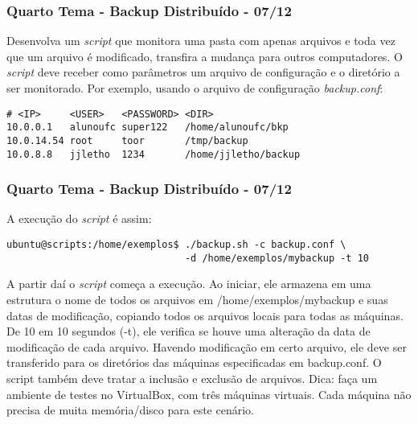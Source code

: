 \documentclass{beamer}
\begin{document}
   \begin{frame}[fragile]
      \frametitle{Quarto Tema - Backup Distribuído - 07/12}
   Desenvolva um \textit{script} que monitora uma pasta com apenas arquivos e toda vez que um arquivo é modificado, transfira a mudança para outros computadores. O \textit{script} deve receber como parâmetros um arquivo de configuração e o diretório a ser monitorado. Por exemplo, usando o arquivo de configuração \textit{backup.conf}:
      \begin{verbatim}
# <IP>     <USER>   <PASSWORD> <DIR>
10.0.0.1   alunoufc super122   /home/alunoufc/bkp
10.0.14.54 root     toor       /tmp/backup
10.0.8.8   jjletho  1234       /home/jjletho/backup
      \end{verbatim}
\end{frame}

   \begin{frame}[fragile]
      \frametitle{Quarto Tema - Backup Distribuído - 07/12}
      \scriptsize
      A execução do \textit{script} é assim:
      \begin{verbatim}
ubuntu@scripts:/home/exemplos$ ./backup.sh -c backup.conf \
                               -d /home/exemplos/mybackup -t 10      
      \end{verbatim}
      A partir daí o \textit{script} começa a execução. Ao iniciar, ele armazena em uma estrutura o nome de todos os arquivos em /home/exemplos/mybackup e suas datas de modificação, copiando todos os arquivos locais para todas as máquinas. De 10 em 10 segundos (-t), ele verifica se houve uma alteração da data de modificação de cada arquivo. Havendo modificação em certo arquivo, ele deve ser transferido para os diretórios das máquinas especificadas em backup.conf. O script também deve tratar a inclusão e exclusão de arquivos. Dica: faça um ambiente de testes no VirtualBox, com três máquinas virtuais. Cada máquina não precisa de muita memória/disco para este cenário.
\end{frame}
\end{document}
